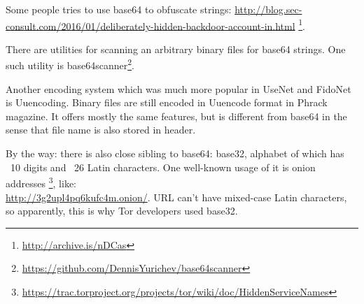 Some people tries to use base64 to obfuscate strings:
\url{http://blog.sec-consult.com/2016/01/deliberately-hidden-backdoor-account-in.html}
\footnote{\url{http://archive.is/nDCas}}.

There are utilities for scanning an arbitrary binary files for base64 strings.
One such utility is base64scanner\footnote{\url{https://github.com/DennisYurichev/base64scanner}}.

Another encoding system which was much more popular in UseNet and FidoNet is Uuencoding.
Binary files are still encoded in Uuencode format in Phrack magazine.
It offers mostly the same features, but is different from base64 in the sense that file name
is also stored in header.

By the way: there is also close sibling to base64: base32, alphabet of which has ~10 digits and ~26 Latin characters.
One well-known usage of it is onion addresses
\footnote{\url{https://trac.torproject.org/projects/tor/wiki/doc/HiddenServiceNames}},
like: \\
\url{http://3g2upl4pq6kufc4m.onion/}.
\ac{URL} can't have mixed-case Latin characters, so apparently, this is why Tor developers used base32.

